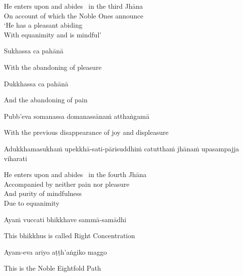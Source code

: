 \begin{english-verses}
  He enters upon and abides \breathmark\ in the third Jhāna\\
  On account of which the Noble Ones announce\\
  `He has a pleasant abiding\\
  With equanimity and is mindful'
\end{english-verses}

Sukhassa ca pahānā

\begin{english}
  With the abandoning of pleasure
\end{english}

Dukkhassa ca pahānā

\begin{english}
  And the abandoning of pain
\end{english}

Pubb'eva somanassa domanassānaṁ atthaṅgamā

\begin{english}
  With the previous disappearance of joy and displeasure\makeatletter\hyperlink{endnote67-appendix}\makeatother
\end{english}

\begin{pali-hang}
  Adukkhamasukhaṁ upekkhā-sati-pārisuddhiṁ catutthaṁ jhānaṁ upasampajja viharati
\end{pali-hang}

\begin{english-verses}
  He enters upon and abides \breathmark\ in the fourth Jhāna\\
  Accompanied by neither pain nor pleasure\\
  And purity of mindfulness\\
  Due to equanimity
\end{english-verses}

Ayaṁ vuccati bhikkhave sammā-samādhi

\begin{english}
  This bhikkhus is called Right Concentration
\end{english}

Ayam-eva ariyo aṭṭh'aṅgiko maggo

\begin{english}
  This is the Noble Eightfold Path
\end{english}

